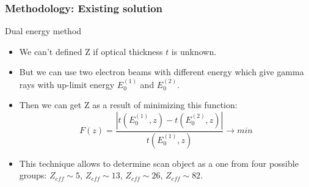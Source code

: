 \documentclass[11pt]{beamer}
\begin{document}
\begin{frame}
\begin{columns}
\begin{column}{0.4\textwidth}
        \end{column}
    \end{columns}  
\end{frame}

\begin{frame}
    \frametitle{Methodology: Existing solution}
    \begin{block}{Dual energy method}%
        \begin{itemize}
            \item We can't defined Z if optical thickness $t$ is unknown.
            \item But we can use two electron beams with different energy which give gamma rays with up-limit energy $E^{(1)}_0$ and $E^{(2)}_0$.
            \item Then we can get Z as a result of minimizing this function:
            $$
            F(z) = \frac{|t(E^{(1)}_0,z) - t(E^{(2)}_0,z)|}{t(E^{(1)}_0,z)} \to min
            $$
            \item This technique allows to determine scan object as a one from four possible groups: $Z_{eff} \sim 5$, $Z_{eff} \sim 13$, $Z_{eff} \sim 26$, $Z_{eff} \sim 82$.
        \end{itemize}

    \end{block}

\end{frame}
\end{document}
